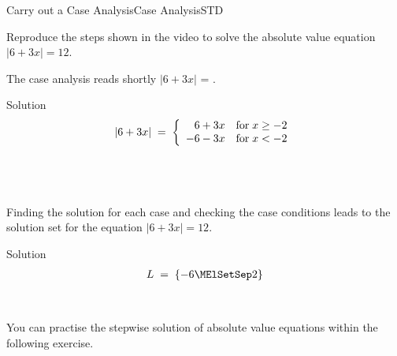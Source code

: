 \begin{MXContent}{Carry out a Case Analysis}{Case Analysis}{STD}
\begin{MExercise}
Reproduce the steps shown in the video  to solve the absolute 
value equation $|6+3x|=12$.

The case analysis reads shortly $|6+3x|$ = .
\begin{MHint}{Solution}
\begin{eqnarray*}
|6+3x| \;=\; \left\lbrace{\begin{array}{rl} 6+3x &\text{for}\;x\geq -2 \\ -6-3x & \text{for}\;x<-2 \end{array}}\right.
\end{eqnarray*}
\end{MHint}\\
\ \\ \ \\
Finding the solution for each case and checking the case conditions leads to the solution set
 for the equation $|6+3x|=12$.

\begin{MHint}{Solution}
\begin{eqnarray*}
\ML \;=\; \{-6\MElSetSep 2\}
\end{eqnarray*}
\end{MHint}\\
\end{MExercise}

You can practise the stepwise solution of absolute value equations within the following exercise. 




\end{MXContent}

